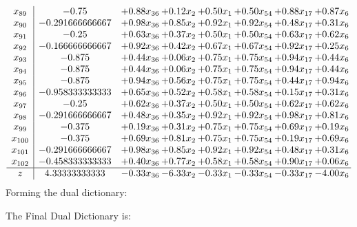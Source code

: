 \documentclass[8pt]{article}
\begin{document}
\[\begin{array}{c| c c@{\hskip 2pt} c@{\hskip 2pt} c@{\hskip 2pt} c@{\hskip 2pt} c@{\hskip 2pt} c@{\hskip 2pt} }
 x_{89}   &  -0.75 & +  0.88 x_{36} & +  0.12 x_{2} & +  0.50 x_{1} & +  0.50 x_{54} & +  0.88 x_{17} & +  0.87 x_{6}\\
 x_{90}   &  -0.291666666667 & +  0.98 x_{36} & +  0.85 x_{2} & +  0.92 x_{1} & +  0.92 x_{54} & +  0.48 x_{17} & +  0.31 x_{6}\\
 x_{91}   &  -0.25 & +  0.63 x_{36} & +  0.37 x_{2} & +  0.50 x_{1} & +  0.50 x_{54} & +  0.63 x_{17} & +  0.62 x_{6}\\
 x_{92}   &  -0.166666666667 & +  0.92 x_{36} & +  0.42 x_{2} & +  0.67 x_{1} & +  0.67 x_{54} & +  0.92 x_{17} & +  0.25 x_{6}\\
 x_{93}   &  -0.875 & +  0.44 x_{36} & +  0.06 x_{2} & +  0.75 x_{1} & +  0.75 x_{54} & +  0.94 x_{17} & +  0.44 x_{6}\\
 x_{94}   &  -0.875 & +  0.44 x_{36} & +  0.06 x_{2} & +  0.75 x_{1} & +  0.75 x_{54} & +  0.94 x_{17} & +  0.44 x_{6}\\
 x_{95}   &  -0.875 & +  0.94 x_{36} & +  0.56 x_{2} & +  0.75 x_{1} & +  0.75 x_{54} & +  0.44 x_{17} & +  0.94 x_{6}\\
 x_{96}   &  -0.958333333333 & +  0.65 x_{36} & +  0.52 x_{2} & +  0.58 x_{1} & +  0.58 x_{54} & +  0.15 x_{17} & +  0.31 x_{6}\\
 x_{97}   &  -0.25 & +  0.62 x_{36} & +  0.37 x_{2} & +  0.50 x_{1} & +  0.50 x_{54} & +  0.62 x_{17} & +  0.62 x_{6}\\
 x_{98}   &  -0.291666666667 & +  0.48 x_{36} & +  0.35 x_{2} & +  0.92 x_{1} & +  0.92 x_{54} & +  0.98 x_{17} & +  0.81 x_{6}\\
 x_{99}   &  -0.375 & +  0.19 x_{36} & +  0.31 x_{2} & +  0.75 x_{1} & +  0.75 x_{54} & +  0.69 x_{17} & +  0.19 x_{6}\\
 x_{100}   &  -0.375 & +  0.69 x_{36} & +  0.81 x_{2} & +  0.75 x_{1} & +  0.75 x_{54} & +  0.19 x_{17} & +  0.69 x_{6}\\
 x_{101}   &  -0.291666666667 & +  0.98 x_{36} & +  0.85 x_{2} & +  0.92 x_{1} & +  0.92 x_{54} & +  0.48 x_{17} & +  0.31 x_{6}\\
 x_{102}   &  -0.458333333333 & +  0.40 x_{36} & +  0.77 x_{2} & +  0.58 x_{1} & +  0.58 x_{54} & +  0.90 x_{17} & +  0.06 x_{6}\\
\hline
z    &  4.33333333333 & -0.33 x_{36} & -6.33 x_{2} & -0.33 x_{1} & -0.33 x_{54} & -0.33 x_{17} & -4.00 x_{6}\\
\end{array}\]
Forming the dual dictionary:

The Final Dual Dictionary is: 
\end{document}
